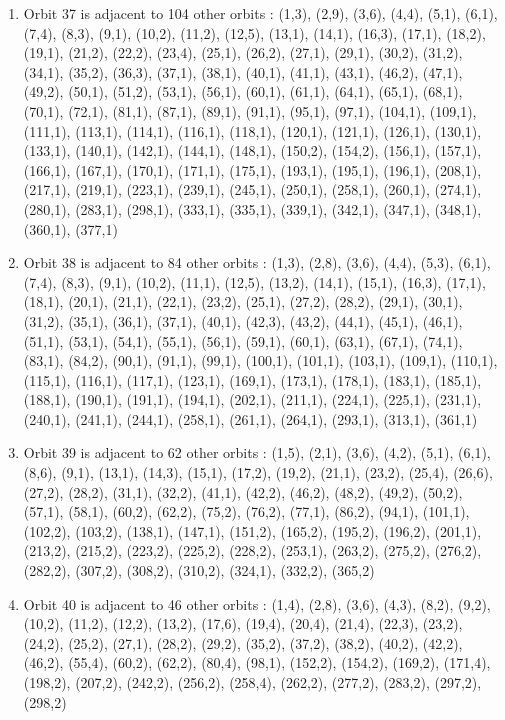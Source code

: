 \documentclass[12pt]{article}
\begin{document}
\begin{enumerate}
\item Orbit 37 is adjacent to 104 other orbits : (1,3), (2,9), (3,6), (4,4), (5,1), (6,1), (7,4), (8,3), (9,1), (10,2), (11,2), (12,5), (13,1), (14,1), (16,3), (17,1), (18,2), (19,1), (21,2), (22,2), (23,4), (25,1), (26,2), (27,1), (29,1), (30,2), (31,2), (34,1), (35,2), (36,3), (37,1), (38,1), (40,1), (41,1), (43,1), (46,2), (47,1), (49,2), (50,1), (51,2), (53,1), (56,1), (60,1), (61,1), (64,1), (65,1), (68,1), (70,1), (72,1), (81,1), (87,1), (89,1), (91,1), (95,1), (97,1), (104,1), (109,1), (111,1), (113,1), (114,1), (116,1), (118,1), (120,1), (121,1), (126,1), (130,1), (133,1), (140,1), (142,1), (144,1), (148,1), (150,2), (154,2), (156,1), (157,1), (166,1), (167,1), (170,1), (171,1), (175,1), (193,1), (195,1), (196,1), (208,1), (217,1), (219,1), (223,1), (239,1), (245,1), (250,1), (258,1), (260,1), (274,1), (280,1), (283,1), (298,1), (333,1), (335,1), (339,1), (342,1), (347,1), (348,1), (360,1), (377,1)
\item Orbit 38 is adjacent to 84 other orbits : (1,3), (2,8), (3,6), (4,4), (5,3), (6,1), (7,4), (8,3), (9,1), (10,2), (11,1), (12,5), (13,2), (14,1), (15,1), (16,3), (17,1), (18,1), (20,1), (21,1), (22,1), (23,2), (25,1), (27,2), (28,2), (29,1), (30,1), (31,2), (35,1), (36,1), (37,1), (40,1), (42,3), (43,2), (44,1), (45,1), (46,1), (51,1), (53,1), (54,1), (55,1), (56,1), (59,1), (60,1), (63,1), (67,1), (74,1), (83,1), (84,2), (90,1), (91,1), (99,1), (100,1), (101,1), (103,1), (109,1), (110,1), (115,1), (116,1), (117,1), (123,1), (169,1), (173,1), (178,1), (183,1), (185,1), (188,1), (190,1), (191,1), (194,1), (202,1), (211,1), (224,1), (225,1), (231,1), (240,1), (241,1), (244,1), (258,1), (261,1), (264,1), (293,1), (313,1), (361,1)
\item Orbit 39 is adjacent to 62 other orbits : (1,5), (2,1), (3,6), (4,2), (5,1), (6,1), (8,6), (9,1), (13,1), (14,3), (15,1), (17,2), (19,2), (21,1), (23,2), (25,4), (26,6), (27,2), (28,2), (31,1), (32,2), (41,1), (42,2), (46,2), (48,2), (49,2), (50,2), (57,1), (58,1), (60,2), (62,2), (75,2), (76,2), (77,1), (86,2), (94,1), (101,1), (102,2), (103,2), (138,1), (147,1), (151,2), (165,2), (195,2), (196,2), (201,1), (213,2), (215,2), (223,2), (225,2), (228,2), (253,1), (263,2), (275,2), (276,2), (282,2), (307,2), (308,2), (310,2), (324,1), (332,2), (365,2)
\item Orbit 40 is adjacent to 46 other orbits : (1,4), (2,8), (3,6), (4,3), (8,2), (9,2), (10,2), (11,2), (12,2), (13,2), (17,6), (19,4), (20,4), (21,4), (22,3), (23,2), (24,2), (25,2), (27,1), (28,2), (29,2), (35,2), (37,2), (38,2), (40,2), (42,2), (46,2), (55,4), (60,2), (62,2), (80,4), (98,1), (152,2), (154,2), (169,2), (171,4), (198,2), (207,2), (242,2), (256,2), (258,4), (262,2), (277,2), (283,2), (297,2), (298,2)

\end{enumerate}
\end{document}

